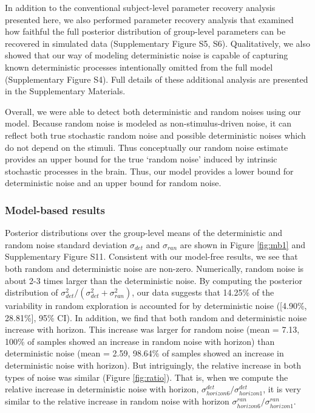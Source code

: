 \documentclass[12pt]{article}
\begin{document}
{In addition to the conventional subject-level parameter recovery analysis presented here, we also performed parameter recovery analysis that examined how faithful the full posterior distribution of group-level parameters can be recovered in simulated data (Supplementary Figure S5, S6). Qualitatively, we also showed that our way of modeling deterministic noise is capable of capturing known deterministic processes intentionally omitted from the full model (Supplementary Figure S4). Full details of these additional analysis are presented in the Supplementary Materials. 
		
Overall, we were able to detect both deterministic and random noises using our model. Because random noise is modeled as non-stimulus-driven noise, it can reflect both true stochastic random noise and possible deterministic noises which do not depend on the stimuli. Thus conceptually our random noise estimate provides an upper bound for the true `random noise' induced by intrinsic stochastic processes in the brain. Thus, our model provides a lower bound for deterministic noise and an upper bound for random noise. 

\subsubsection*{Model-based results} 
Posterior distributions over the group-level means of the deterministic and random noise standard deviation $\sigma_{det}$ and $\sigma_{ran}$ are shown in Figure \ref{fig:mb1} and Supplementary Figure S11. Consistent with our model-free results, we see that both random and deterministic noise are non-zero. Numerically, random noise is about 2-3 times larger than the deterministic noise. By computing the posterior distribution of $\sigma^2_{det}/(\sigma^2_{det}+\sigma^2_{ran})$, our data suggests that 14.25\% of the variability in random exploration is accounted for by deterministic noise ([4.90\%, 28.81\%], 95\% CI). In addition, we find that both random and deterministic noise increase with horizon. This increase was larger for random noise (mean = 7.13, 100\% of samples showed an increase in random noise with horizon) than deterministic noise (mean = 2.59, 98.64\% of samples showed an increase in deterministic noise with horizon). But intriguingly, the relative increase in both types of noise was similar (Figure \ref{fig:ratio}). That is, when we compute the relative increase in deterministic noise with horizon, $\sigma^{det}_{horizon6}/\sigma^{det}_{horizon1}$, it is very similar to the relative increase in random noise with horizon $\sigma^{ran}_{horizon6}/\sigma^{ran}_{horizon1}$. 

}
\end{document}
